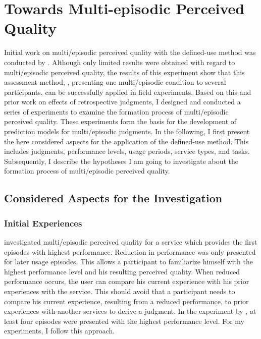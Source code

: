 \chapter{Towards Multi-episodic Perceived Quality}\label{chap:towards}
Initial work on multi\-/episodic perceived quality with the  defined-use method was conducted by \citet{moller_single-call_2011}.
Although only limited results were obtained with regard to multi\-/episodic perceived quality, the results of this experiment show that this assessment method, \ie, presenting one multi\-/episodic condition to several participants, can be successfully applied in field experiments.
Based on this and prior work on effects of retrospective judgments, I designed and conducted a series of experiments to examine the formation process of multi\-/episodic perceived quality. 
These experiments form the basis for the development of prediction models for multi\-/episodic judgments.
In the following, I first present the here considered aspects for the application of the defined-use method.
This includes judgments, performance levels, usage periods, service types, and tasks.
Subsequently, I describe the hypotheses I am going to investigate about the formation process of multi\-/episodic perceived quality.

\section{Considered Aspects for the Investigation}

\subsection{Initial Experiences}
\citet{moller_single-call_2011} investigated multi\-/episodic perceived quality for a service which provides the first episodes with highest performance.
Reduction in performance was only presented for later usage episodes.
This allows a participant to familiarize himself with the highest performance level and his resulting perceived quality.
When reduced performance occurs, the user can compare his current experience with his prior experiences with the service.
This should avoid that a participant needs to compare his current experience, resulting from a reduced performance, to prior experiences with another services to derive a judgment.
In the experiment by \citet{moller_single-call_2011}, at least four episodes were presented with the highest performance level.
For my experiments, I follow this approach.

